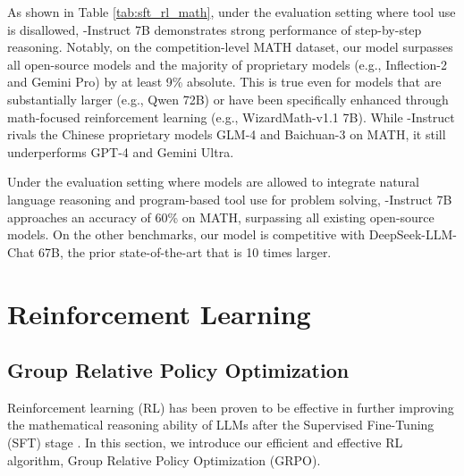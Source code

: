 \endgroup


As shown in Table \ref{tab:sft_rl_math}, under the evaluation setting where tool use is disallowed, \spmath-Instruct 7B demonstrates strong performance of step-by-step reasoning.
Notably, on the competition-level MATH dataset, our model surpasses all open-source models and the majority of proprietary models (e.g., Inflection-2 and Gemini Pro) by at least 9\% absolute.
This is true even for models that are substantially larger (e.g., Qwen 72B) or have been specifically enhanced through math-focused reinforcement learning (e.g., WizardMath-v1.1 7B).
While \spmath-Instruct rivals the Chinese proprietary models GLM-4 and Baichuan-3 on MATH, it still underperforms GPT-4 and Gemini Ultra.

Under the evaluation setting where models are allowed to integrate natural language reasoning and program-based tool use for problem solving, \spmath-Instruct 7B approaches an accuracy of 60\% on MATH, surpassing all existing open-source models.
On the other benchmarks, our model is competitive with DeepSeek-LLM-Chat 67B, the prior state-of-the-art that is 10 times larger.
\section{Reinforcement Learning}

\subsection{Group Relative Policy Optimization}
Reinforcement learning (RL) has been proven to be effective in further improving the mathematical reasoning ability of LLMs after the Supervised Fine-Tuning (SFT) stage \citep{wang2023math,wizardmath}.
In this section, we introduce our efficient and effective RL algorithm, Group Relative Policy Optimization (GRPO).




